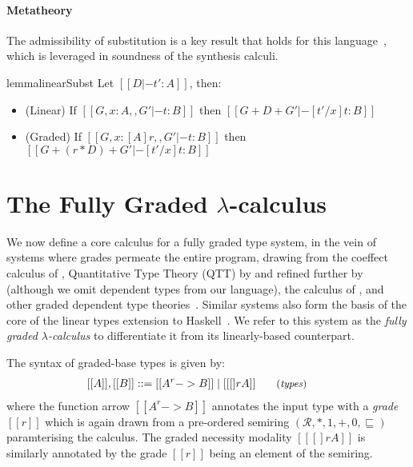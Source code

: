 \paragraph{Metatheory}
The admissibility of substitution is a key result that holds
for this language~\cite{DBLP:journals/pacmpl/OrchardLE19}, which is
leveraged in soundness of the synthesis calculi.
%
\begin{restatable}{lemma}{linearSubst}
Let $[[ D |- t' : A]]$, then:
\label{lemma:substitution}
\begin{itemize}[leftmargin=1em]
\item (Linear) \hspace{0.04em} If $[[ {G, x : A}
    ,, { G' } |- t : B]]$ then $[[ G + D + G' |-
[ t' / x ] t : B ]]$
\item (Graded) If $[[ {G, x : [A] r} ,, { G' } |- t : B]]$
then $[[ G + (r * D) + G' |- [ t' / x ] t : B ]]$
\end{itemize}
\end{restatable}

\section{The Fully Graded $\lambda$-calculus}
\label{sec:graded-base}
We now define a core calculus for a fully graded type system, in the vein of
systems where grades permeate the entire program, drawing from the coeffect
calculus of \citet{petricek2014coeffects}, Quantitative Type Theory (QTT) by
\citet{McBride2016} and refined further by \citet{quantitative-type-theory}
(although we omit dependent types from our language), the calculus of
\citet{DBLP:journals/pacmpl/AbelB20}, and other graded dependent type
theories~\cite{quantitative-type-theory,DBLP:conf/esop/MoonEO21}. Similar
systems also form the basis of the core of the linear types extension to
Haskell~\cite{DBLP:journals/pacmpl/BernardyBNJS18}. We refer to this system as
the \textit{fully graded $\lambda$-calculus} to differentiate it from its linearly-based
counterpart.

The syntax of graded-base types is given by:
\begin{align*}
\hspace{-0.9em}[[ A ]] , [[ B ]] & ::=
       [[ A ^ r -> B ]]
  \mid [[ [] r A ]]
{\small{\tag{\textit{types}}}}
\end{align*}
where the function arrow $[[ A ^ r -> B ]]$ annotates the input type with a \emph{grade} $[[ r ]]$
which is again drawn from a pre-ordered semiring
$(\mathcal{R}, {\ast}, {1}, {+}, {0}, \sqsubseteq)$ paramterising the
calculus. The graded necessity modality $[[ [] r A ]]$ is similarly annotated by the grade
$[[ r ]]$ being an element of the semiring. 

